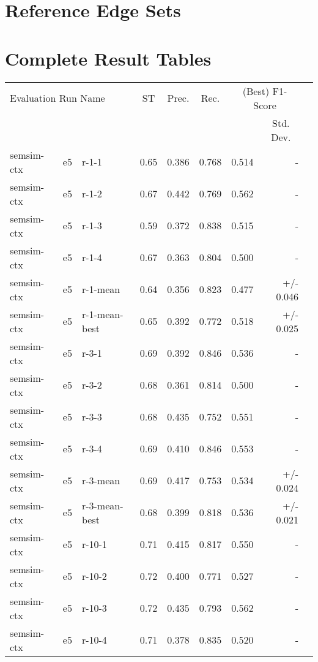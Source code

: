 \section{Reference Edge Sets}
\label{app-sec:ref-edge-sets}


\section{Complete Result Tables}
\label{app-sec:result-tables}

\begin{table}[H]
\centering
\begin{tabular}{lllrrrrrr}
\toprule
\multicolumn{3}{l}{Evaluation Run Name}	& \multicolumn{1}{c}{ST} & \multicolumn{1}{c}{Prec.} & \multicolumn{1}{c}{Rec.} & \multicolumn{2}{c}{(Best) F1-Score}\\
\cmidrule{7-8}
\multicolumn{7}{l}{} & \multicolumn{1}{c}{Std. Dev.} \\
\midrule
semsim-ctx & e5 & r-1-1 & 0.65 & 0.386 & 0.768 & 0.514 & - \\
semsim-ctx & e5 & r-1-2 & 0.67 & 0.442 & 0.769 & 0.562 & - \\
semsim-ctx & e5 & r-1-3 & 0.59 & 0.372 & 0.838 & 0.515 & - \\
semsim-ctx & e5 & r-1-4 & 0.67 & 0.363 & 0.804 & 0.500 & - \\
semsim-ctx & e5 & r-1-mean & 0.64 & 0.356 & 0.823 & 0.477 & +/- 0.046 \\
semsim-ctx & e5 & r-1-mean-best & 0.65 & 0.392 & 0.772 & 0.518 & +/- 0.025 \\
\hline
semsim-ctx & e5 & r-3-1 & 0.69 & 0.392 & 0.846 & 0.536 & - \\
semsim-ctx & e5 & r-3-2 & 0.68 & 0.361 & 0.814 & 0.500 & - \\
semsim-ctx & e5 & r-3-3 & 0.68 & 0.435 & 0.752 & 0.551 & - \\
semsim-ctx & e5 & r-3-4 & 0.69 & 0.410 & 0.846 & 0.553 & - \\
semsim-ctx & e5 & r-3-mean & 0.69 & 0.417 & 0.753 & 0.534 & +/- 0.024 \\
semsim-ctx & e5 & r-3-mean-best & 0.68 & 0.399 & 0.818 & 0.536 & +/- 0.021 \\
\hline
semsim-ctx & e5 & r-10-1 & 0.71 & 0.415 & 0.817 & 0.550 & - \\
semsim-ctx & e5 & r-10-2 & 0.72 & 0.400 & 0.771 & 0.527 & - \\
semsim-ctx & e5 & r-10-3 & 0.72 & 0.435 & 0.793 & 0.562 & - \\
semsim-ctx & e5 & r-10-4 & 0.71 & 0.378 & 0.835 & 0.520 & - \\

\end{tabular}
\end{table}
